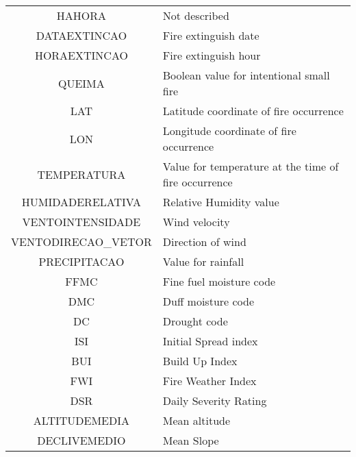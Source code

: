 \begin{table}[H]
\begin{tabular}{cp{8.5cm}}
		HAHORA & Not described \\
		DATAEXTINCAO & Fire extinguish date \\
		HORAEXTINCAO & Fire extinguish hour \\
		QUEIMA & Boolean value for intentional small fire\\
		LAT & Latitude coordinate of fire occurrence\\
		LON & Longitude coordinate of fire occurrence\\
		TEMPERATURA & Value for temperature at the time of fire occurrence\\
		HUMIDADERELATIVA & Relative Humidity value\\
		VENTOINTENSIDADE & Wind velocity\\
		VENTODIRECAO\_VETOR & Direction of wind\\
		PRECIPITACAO & Value for rainfall\\
		FFMC & Fine fuel moisture code\\
		DMC & Duff moisture code\\
		DC & Drought code\\
		ISI & Initial Spread index\\
		BUI & Build Up Index\\
		FWI & Fire Weather Index\\
		DSR & Daily Severity Rating\\
		ALTITUDEMEDIA & Mean altitude\\
		DECLIVEMEDIO & Mean Slope\\
		\hline
	\end{tabular}
\end{table}

